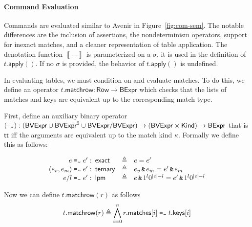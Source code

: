 \documentclass{article}
\newcommand{\denote}[1]{\left\llbracket#1\right\rrbracket}
\newcommand{\TRUE}{\mathsf{tt}}
\newcommand{\BVExpr}{\mathsf{BVExpr}}
\newcommand{\BExpr}{\mathsf{BExpr}}
\newcommand{\Row}{\mathsf{Row}}
\newcommand{\Kind}{\mathsf{Kind}}
\newcommand{\matches}{\mathsf{matches}}
\newcommand{\keys}{\mathsf{keys}}
\newcommand{\apply}{\mathsf{apply}}
\newcommand{\exact}{\ensuremath{\mathsf{exact}}}
\newcommand{\ternary}{\ensuremath{\mathsf{ternary}}}
\newcommand{\lpm}{\ensuremath{\mathsf{lpm}}}
\newcommand{\bvand}{\mathop{\texttt{\&}}}
\newcommand{\match}{\mathrel{\texttt{{=}\raisebox{-2.5px}{\textasciitilde}}}}
\newcommand{\matchrow}{\mathsf{matchrow}}
\begin{document}
\paragraph{Command Evaluation}
Commands are evaluated similar to Avenir in Figure~\ref{fig:com-sem}. The
notable differences are the inclusion of assertions, the nondeterminism
operators, support for inexact matches, and a cleaner representation of table
application. The denotation function $\denote{-}$ is parameterized on a
$\sigma$, it is used in the definition of $t.\apply()$. If no $\sigma$ is
provided, the behavior of $t.\apply()$ is undefined.

In evaluating tables, we must condition on and evaluate matches. To do this, we
define an operator $t.\matchrow : \Row \to \BExpr$ which checks that the lists of
matches and keys are equivalent up to the corresponding match type.

First, define an auxiliary binary operator $(\match) : (\BVExpr \cup \BVExpr^2 \cup \BVExpr/\BVExpr) \to (\BVExpr \times \Kind) \to \BExpr$ that is $\TRUE$ iff the arguments are equivalent up
to the match kind $\kappa$. Formally we define this as follows:

\[
\begin{array}{r<{\!\!\!} l >{\triangleq}cl}
  e \match e' :& \exact && e = e' \\
  (e_v,e_m) \match e' :& \ternary && e_v \bvand e_m = e' \bvand e_m \\
  e/l \match  e' :& \lpm && e \bvand 1^l0^{|e| - l} = e' \bvand 1^l0^{|e| - l} \\
\end{array}
\]

Now we can define $t.\matchrow(r)$ as follows
\[t.\matchrow(r) \triangleq
   \bigwedge_{i = 0}^n r.\matches[i] \match t.\keys[i]
\]
\end{document}

